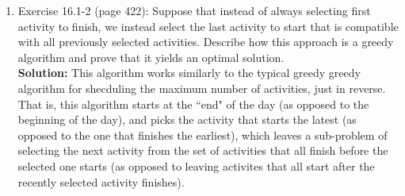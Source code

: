 \documentclass[11pts]{article}
\newcommand{\BigTheta}[1]{\ensuremath{\operatorname{\Theta}\bigl(#1\bigr)}}
\begin{document}
\begin{enumerate}
\begin{enumerate}
\begin{algorithm}{FIND-VALID-SCHEDULE}[ $S( 0 \dots n - 1 ), r$ ]{
   }
   \\
  \qdo \\
    $D[i] = S[i].b / S[i].t$ \\
  \qrof
   \\
   \\
   \\
  \do \\
    $density_{tot} = density_{tot} + D[i]$ \\
    \qif $density_{tot} > r$ \\
    \qthen \\
      \qreturn \qfalse {}
    \qfi
  \qrof \\

   \\
  \do \\
    Run stream D[i].identifier
  \qrof \\

  \qreturn \qtrue {}
  
\end{algorithm}

  This is a
  $\BigTheta{n * 2} + \BigTheta{n\lg{n}} + \BigTheta{n} = \BigTheta{n\lg{n}}$
  algorithm.
  \end{enumerate}

\newpage
\item Exercise 16.1-2 (page 422): Suppose that instead of always selecting
first activity to finish, we instead select the last activity to start that
is compatible with all previously selected activities. Describe how this
approach is a greedy algorithm and prove that it yields an optimal solution. \\

  \textbf{Solution:} This algorithm works similarly to the typical greedy
  greedy algorithm for shecduling the maximum number of activities, just in
  reverse. That is, this algorithm starts at the ``end" of the day (as
  opposed to the beginning of the day), and picks
  the activity that starts the latest (as opposed to the one that finishes
  the earliest), which leaves a sub-problem of selecting the next activity
  from the set of activities that all finish before the selected one starts
  (as opposed to leaving activites that all start after the recently selected
  activity finishes). \\


\end{enumerate}
\end{document}
